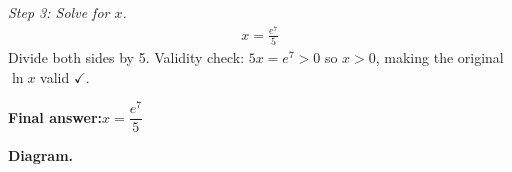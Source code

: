 \documentclass[11pt]{article}
\begin{document}
\textit{Step 3: Solve for \( x \).}
\[\begin{gathered}
x = \frac{e^7}{5}
\end{gathered}\]
Divide both sides by 5. Validity check: \( 5x = e^7 > 0 \) so \( x > 0 \), making the original \( \ln x \) valid $\checkmark$.

\begin{answerbox}
\textbf{Final answer:}\quad \(\displaystyle  x = \dfrac{e^7}{5} \)
\end{answerbox}
\textbf{Diagram.}

\begin{center}
\end{center}
\end{document}
